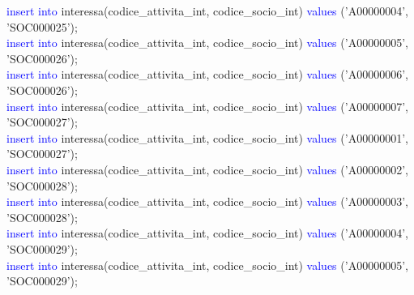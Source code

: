 \documentclass{article}
\begin{document}
\begin{flushleft}
{        \hspace*{0.5em}\textcolor{blue}{insert into} interessa(codice\_attivita\_int, codice\_socio\_int) \textcolor{blue}{values} \hspace*{0.5em}('A00000004', 'SOC000025'); \\
        \hspace*{0.5em}\textcolor{blue}{insert into} interessa(codice\_attivita\_int, codice\_socio\_int) \textcolor{blue}{values} \hspace*{0.5em}('A00000005', 'SOC000026'); \\
        \hspace*{0.5em}\textcolor{blue}{insert into} interessa(codice\_attivita\_int, codice\_socio\_int) \textcolor{blue}{values} \hspace*{0.5em}('A00000006', 'SOC000026'); \\
        \hspace*{0.5em}\textcolor{blue}{insert into} interessa(codice\_attivita\_int, codice\_socio\_int) \textcolor{blue}{values} \hspace*{0.5em}('A00000007', 'SOC000027'); \\
        \hspace*{0.5em}\textcolor{blue}{insert into} interessa(codice\_attivita\_int, codice\_socio\_int) \textcolor{blue}{values} \hspace*{0.5em}('A00000001', 'SOC000027'); \\
        \hspace*{0.5em}\textcolor{blue}{insert into} interessa(codice\_attivita\_int, codice\_socio\_int) \textcolor{blue}{values} \hspace*{0.5em}('A00000002', 'SOC000028'); \\
        \hspace*{0.5em}\textcolor{blue}{insert into} interessa(codice\_attivita\_int, codice\_socio\_int) \textcolor{blue}{values} \hspace*{0.5em}('A00000003', 'SOC000028'); \\
        \hspace*{0.5em}\textcolor{blue}{insert into} interessa(codice\_attivita\_int, codice\_socio\_int) \textcolor{blue}{values} \hspace*{0.5em}('A00000004', 'SOC000029'); \\
        \hspace*{0.5em}\textcolor{blue}{insert into} interessa(codice\_attivita\_int, codice\_socio\_int) \textcolor{blue}{values} \hspace*{0.5em}('A00000005', 'SOC000029'); \\
}
\end{flushleft}
\end{document}

